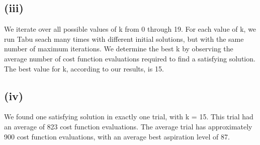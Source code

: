 \documentclass[12pt]{article}
\begin{document}
\subsection{(iii)}
We iterate over all possible values of k from 0 through 19. For each value of k, we run Tabu seach many times with different initial solutions, but with the same number of maximum iterations. We determine the best k by observing the average number of cost function evaluations required to find a satisfying solution. The best value for k, according to our results, is 15.

\subsection{(iv)}
We found one satisfying solution in exactly one trial, with k = 15. This trial had an average of 823 cost function evaluations. The average trial has approximately 900 cost function evaluations, with an average best aspiration level of 87.
\end{document}

